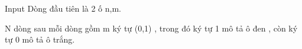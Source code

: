 Input
Dòng đầu tiên là 2 ố n,m.

N dòng sau mỗi dòng gồm m ký tự (0,1) , trong đó ký tự 1 mô tả ô đen , còn ký tự 0 mô tả ô trắng.